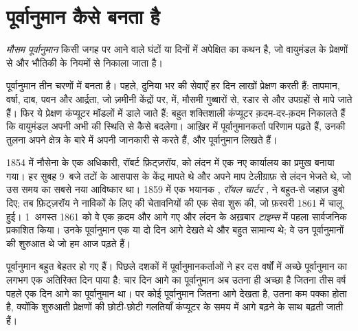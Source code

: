 \section{पूर्वानुमान कैसे बनता है}

\begin{definition}[मौसम पूर्वानुमान]\label{def:g8:fronts-and-weather-maps:forecast}
\emph{मौसम पूर्वानुमान} किसी जगह पर आने वाले घंटों या दिनों में
अपेक्षित  का कथन है, जो वायुमंडल के प्रेक्षणों से और भौतिकी के नियमों से निकाला
जाता है।
\end{definition}

पूर्वानुमान तीन चरणों में बनता है। पहले, दुनिया भर की  सेवाएँ हर दिन लाखों प्रेक्षण
करती हैं: तापमान, वर्षा, दाब, पवन और आर्द्रता, जो ज़मीनी केंद्रों पर,  में, मौसमी
गुब्बारों से, रडार से और उपग्रहों से मापे जाते हैं। फिर ये प्रेक्षण कंप्यूटर मॉडलों में
डाले जाते हैं: बहुत शक्तिशाली कंप्यूटर क़दम-दर-क़दम निकालते हैं कि वायुमंडल अपनी अभी की
स्थिति से कैसे बदलेगा। आख़िर में पूर्वानुमानकर्ता परिणाम पढ़ते हैं, उनकी तुलना अपने
क्षेत्र के बारे में अपनी जानकारी से करते हैं, और पूर्वानुमान लिखते
हैं।

\begin{history}
1854 में नौसेना के एक अधिकारी, रॉबर्ट फ़िट्ज़रॉय, को लंदन में एक नए  कार्यालय का
प्रमुख बनाया गया। हर सुबह 9~बजे तटों के आसपास के केंद्र  मापते थे और अपने माप
टेलीग्राफ़ से लंदन भेजते थे, जो उस समय का सबसे नया आविष्कार था। 1859 में एक भयानक
, \emph{रॉयल चार्टर} , ने बहुत-से जहाज़ डुबो दिए; तब फ़िट्ज़रॉय ने नाविकों
के लिए  की चेतावनियों की एक सेवा शुरू की, जो फ़रवरी 1861 में चालू हुई।
1~अगस्त 1861 को वे एक क़दम और आगे गए और लंदन के अख़बार \emph{टाइम्स} में पहला
सार्वजनिक  प्रकाशित किया। उनके पूर्वानुमान एक या दो दिन आगे देखते थे
और बहुत सामान्य थे; वे उन पूर्वानुमानों की शुरुआत थे जो हम आज
पढ़ते हैं।
\end{history}

पूर्वानुमान बहुत बेहतर हो गए हैं। पिछले दशकों में पूर्वानुमानकर्ताओं ने हर दस वर्षों में
अच्छे पूर्वानुमान का लगभग एक अतिरिक्त दिन पाया है: चार दिन आगे का पूर्वानुमान अब उतना
ही अच्छा है जितना तीस वर्ष पहले एक दिन आगे का पूर्वानुमान था। पर कोई पूर्वानुमान जितना
आगे देखता है, उतना कम पक्का होता है, क्योंकि शुरुआती प्रेक्षणों की छोटी-छोटी गलतियाँ
कंप्यूटर के समय में आगे बढ़ने के साथ बढ़ती जाती
हैं।

